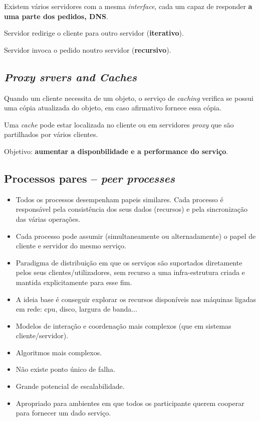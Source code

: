 \documentclass{article}
\begin{document}
Existem vários servidores com a mesma \textit{interface}, cada um capaz de responder \textbf{a uma parte dos pedidos, DNS}.

Servidor redirige o cliente para outro servidor (\textbf{iterativo}).

Servidor invoca o pedido noutro servidor (\textbf{recursivo}).

\subsection{\textit{Proxy srvers and Caches}}

Quando um cliente necessita de um objeto, o serviço de \textit{caching} verifica se possui uma cópia atualizada do objeto, em caso afirmativo fornece essa cópia.

Uma \textit{cache} pode estar localizada no cliente ou em servidores \textit{proxy} que são partilhados por vários clientes.

Objetivo: \textbf{aumentar a disponbilidade e a performance do serviço}.

\subsection{Processos pares -- \textit{peer processes}}

\begin{itemize}
	\item Todos os processos desempenham papeis similares. Cada processo é responsável pela consistência dos seus dados (recursos) e pela sincronização das várias operações.
	\item Cada processo pode assumir (simultaneamente ou alternadamente) o papel de cliente e servidor do mesmo serviço.
	\item Paradigma de distribuição em que os serviços são suportados diretamente pelos seus clientes/utilizadores, sem recurso a uma infra-estrutura criada e mantida explicitamente para esse fim.
	\item A ideia base é conseguir explorar os recursos disponíveis nas máquinas ligadas em rede: cpu, disco, largura de banda...
	\item Modelos de interação e coordenação mais complexos (que em sistemas cliente/servidor).
	\item Algoritmos mais complexos.
	\item Não existe ponto único de falha.
	\item Grande potencial de escalabilidade.
	\item Apropriado para ambientes em que todos os participante querem cooperar para fornecer um dado serviço.
\end{itemize}
\end{document}
